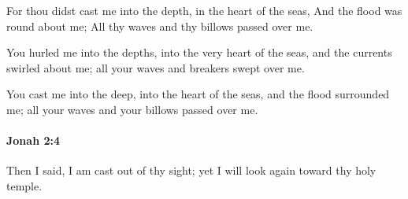 			\begin{versebox}
					\item[BHS] 
					\item[LXX] 
					\item[ASV] For thou didst cast me into the depth, in the heart of the seas, And the flood was round about me; All thy waves and thy billows passed over me.
					\item[NIV] You hurled me into the depths, into the very heart of the seas, and the currents swirled about me; all your waves and breakers swept over me.
					\item[NRSV] You cast me into the deep, into the heart of the seas, and the flood surrounded me; all your waves and your billows passed over me.
			\end{versebox}

		\paragraph{Jonah 2:4} %
			\label{JONAH-2-4}

			Then I said, I am cast out of thy sight; yet I will look again toward thy holy temple.

